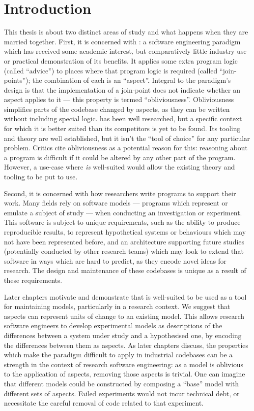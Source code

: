 \chapter{Introduction}

 This
thesis is about two distinct areas of study and what happens when they are
married together. First, it is concerned with \aop{}: a software engineering
paradigm which has received some academic interest, but comparatively little
industry use or practical demonstration of its benefits. It applies some extra
program logic (called ``advice'') to places where that program logic is required
(called ``join-points''); the combination of each is an ``aspect''. Integral to
the paradigm's design is that the implementation of a join-point does not
indicate whether an aspect applies to it --- this property is termed
``obliviousness''. Obliviousness simplifies parts of the codebase changed by
aspects, as they can be written without including special \aop{} logic.
\Aspectorientation has been well researched, but a specific context for which it
is better suited than its competitors is yet to be found. Its tooling and theory
are well established, but it isn't the ``tool of choice'' for any particular
problem. Critics cite obliviousness as a potential reason for this: reasoning
about a program is difficult if it could be altered by any other part of the
program. However, a use-case where \aop{} \emph{is} well-suited would allow the
existing theory and tooling to be put to use.

Second, it is concerned with how researchers write programs to support their
work. Many fields rely on software models --- programs which represent or
emulate a subject of study --- when conducting an investigation or experiment.
This software is subject to unique requirements, such as the ability to produce
reproducible results, to represent hypothetical systems or behaviours which may
not have been represented before, and an architecture supporting future studies
(potentially conducted by other research teams) which may look to extend that
software in ways which are hard to predict, as they encode novel ideas for
research. The design and maintenance of these codebases is unique as a result of
these requirements.

Later chapters motivate and demonstrate that \aop{} is well-suited to be used as
a tool for maintaining models, particularly in a research context. We suggest
that aspects can represent units of change to an existing model. This allows
research software engineers to develop experimental models as descriptions of
the differences between a system under study and a hypothesised one, by encoding
the differences between them as aspects. As later chapters discuss, the
properties which make the paradigm difficult to apply in industrial codebases
can be a strength in the context of research software engineering: as a model is
oblivious to the application of aspects, removing those aspects is trivial. One
can imagine that different models could be constructed by composing a ``base''
model with different sets of aspects. Failed experiments would not incur
technical debt, or necessitate the careful removal of code related to that
experiment.

